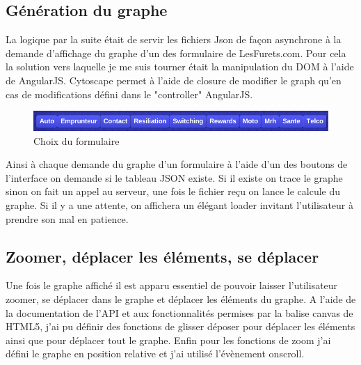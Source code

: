 \subsection{Génération du graphe}
La logique par la suite était de servir les fichiers Json de façon asynchrone à la demande d'affichage du graphe d'un des formulaire de LesFurets.com. Pour cela la solution vers laquelle je me suis tourner était la manipulation du DOM à l'aide de AngularJS. Cytoscape permet à l'aide de closure de modifier le graph qu'en cas de modifications défini dans le "controller" AngularJS. 
\vspace{0.2in}
\begin{figure}[!ht]
\center
\includegraphics[width=15cm]{outil/buttons-tunnels.png}
\caption{Choix du formulaire}
\end{figure}
Ainsi à chaque demande du graphe d'un formulaire à l'aide d'un des boutons de l'interface on demande si le tableau JSON existe. Si il existe on trace le graphe sinon on fait un appel au serveur, une fois le fichier reçu on lance le calcule du graphe. Si il y a une attente, on affichera un élégant loader invitant l'utilisateur à prendre son mal en patience. 

\subsection{Zoomer, déplacer les éléments, se déplacer}
Une fois le graphe affiché il est apparu essentiel de pouvoir laisser l’utilisateur zoomer, se déplacer dans le graphe et déplacer les éléments du graphe. A l'aide de la documentation de l'API et aux fonctionnalités permises par la balise canvas de HTML5, j'ai pu définir des fonctions de glisser déposer pour déplacer les éléments ainsi que pour déplacer tout le graphe. Enfin pour les fonctions de zoom j'ai défini le graphe en position relative et j'ai utilisé l'évènement onscroll.

